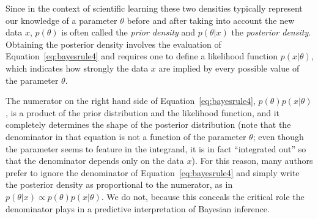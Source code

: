 Since in the context of scientific learning these two densities typically represent our knowledge of a parameter $\theta$ before and after taking into account the new data $x$, $p(\theta)$ is often called the \emph{prior density} and $p(\theta|x)$ the \emph{posterior density}.  Obtaining the posterior density involves the evaluation of Equation~\ref{eq:bayesrule4} and requires one to define a likelihood function $p(x|\theta)$, which indicates how strongly the data $x$ are implied by every possible value of the parameter $\theta$.

The numerator on the right hand side of Equation~\ref{eq:bayesrule4}, $p(\theta)p(x|\theta)$,  is a product of the prior distribution and the likelihood function, and it completely determines the shape of the posterior distribution (note that the denominator in that equation is not a function of the parameter $\theta$; even though the parameter seems to feature in the integrand, it is in fact ``integrated out'' so that the denominator depends only on the data $x$). For this reason, many authors prefer to ignore the denominator of Equation~\ref{eq:bayesrule4} and simply write the posterior density as proportional to the numerator, as in $p(\theta|x)\propto p(\theta)p(x|\theta)$. We do not, because this conceals the critical role the denominator plays in a predictive interpretation of Bayesian inference.

